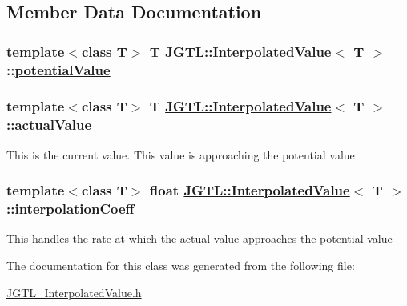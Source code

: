 \subsection{Member Data Documentation}
\hypertarget{class_j_g_t_l_1_1_interpolated_value_38e69e9add9640f5678a877ffd99ac4e}{
\subsubsection[potentialValue]{\setlength{\rightskip}{0pt plus 5cm}template$<$class T$>$ T \hyperlink{class_j_g_t_l_1_1_interpolated_value}{JGTL::Interpolated\-Value}$<$ T $>$::\hyperlink{class_j_g_t_l_1_1_interpolated_value_38e69e9add9640f5678a877ffd99ac4e}{potential\-Value}}}
\label{class_j_g_t_l_1_1_interpolated_value_38e69e9add9640f5678a877ffd99ac4e}


\hypertarget{class_j_g_t_l_1_1_interpolated_value_db402fa9ddb87fc80411e1bbbd88241f}{
\subsubsection[actualValue]{\setlength{\rightskip}{0pt plus 5cm}template$<$class T$>$ T \hyperlink{class_j_g_t_l_1_1_interpolated_value}{JGTL::Interpolated\-Value}$<$ T $>$::\hyperlink{class_j_g_t_l_1_1_interpolated_value_db402fa9ddb87fc80411e1bbbd88241f}{actual\-Value}}}
\label{class_j_g_t_l_1_1_interpolated_value_db402fa9ddb87fc80411e1bbbd88241f}


This is the current value. This value is approaching the potential value \hypertarget{class_j_g_t_l_1_1_interpolated_value_5f7a5762a8a5cb68597b8fc1a406d9d0}{
\subsubsection[interpolationCoeff]{\setlength{\rightskip}{0pt plus 5cm}template$<$class T$>$ float \hyperlink{class_j_g_t_l_1_1_interpolated_value}{JGTL::Interpolated\-Value}$<$ T $>$::\hyperlink{class_j_g_t_l_1_1_interpolated_value_5f7a5762a8a5cb68597b8fc1a406d9d0}{interpolation\-Coeff}}}
\label{class_j_g_t_l_1_1_interpolated_value_5f7a5762a8a5cb68597b8fc1a406d9d0}


This handles the rate at which the actual value approaches the potential value 

The documentation for this class was generated from the following file:\begin{CompactItemize}
\item 
\hyperlink{_j_g_t_l___interpolated_value_8h}{JGTL\_\-Interpolated\-Value.h}\end{CompactItemize}
